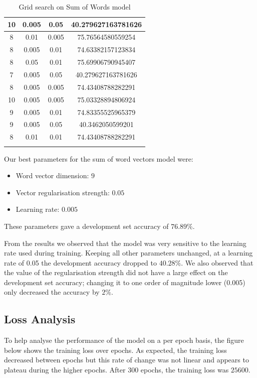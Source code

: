 \documentclass{article} %
\begin{document}
\begin{table}[htb]
{\begin{tabular}{|c|c|c|c|}
10 & 0.005 & 0.05 & 40.279627163781626 \\ \hline
8 & 0.01 & 0.005 & 75.76564580559254 \\ \hline
8 & 0.005 & 0.01 & 74.63382157123834 \\ \hline
8 & 0.05 & 0.01 & 75.69906790945407 \\ \hline
7 & 0.005 & 0.05 & 40.279627163781626 \\ \hline
8 & 0.005 & 0.005 & 74.43408788282291 \\ \hline
10 & 0.005 & 0.005 & 75.03328894806924 \\ \hline
9 & 0.005 & 0.01 & 74.83355525965379 \\ \hline
9 & 0.005 & 0.05 & 40.3462050599201 \\ \hline
8 & 0.01 & 0.01 & 74.43408788282291 \\	 \hline
\label{mainresults}
\end{tabular}
}
\caption{Grid search on Sum of Words model}
\end{table}

Our best parameters for the sum of word vectors model were:

\begin{itemize}

\item Word vector dimension: $9$
\item Vector regularisation strength: $0.05$
\item Learning rate: $0.005$

\end{itemize}

These parameters gave a development set accuracy of $76.89\%$.

From the results we observed that the model was very sensitive to the learning rate used during training. Keeping all other parameters unchanged, at a learning rate of 0.05 the development accuracy dropped to $40.28\%$. We also observed that the value of the regularisation strength did not have a large effect on the development set accuracy; changing it to one order of magnitude lower (0.005) only decreased the accuracy by $2\%$.

\subsection{Loss Analysis}

To help analyse the performance of the model on a per epoch basis, the figure below shows the training loss over epochs. As expected, the training loss decreased between epochs but this rate of change was not linear and appears to plateau during the higher epochs. 
After 300 epochs, the training loss was $25600$.
\end{document}
